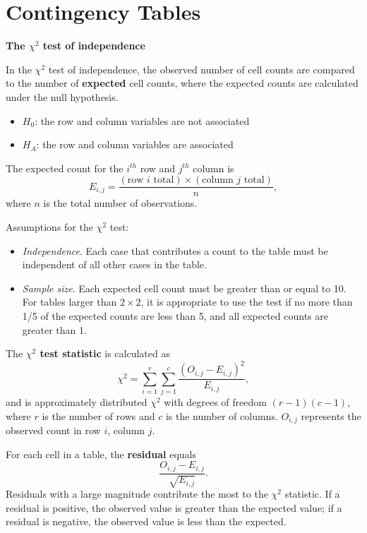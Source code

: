 \documentclass[letterpaper,12pt,twoside,]{pinp}
\begin{document}
\newpage

\hypertarget{contingency-tables}{%
\section{Contingency Tables}\label{contingency-tables}}

\textbf{The \(\chi^2\) test of independence}

In the \(\chi^2\) test of independence, the observed number of cell
counts are compared to the number of \textbf{expected} cell counts,
where the expected counts are calculated under the null hypothesis.

\begin{itemize}
\item
  \(H_0\): the row and column variables are not associated
\item
  \(H_A\): the row and column variables are associated
\end{itemize}

The expected count for the \(i^{th}\) row and \(j^{th}\) column is
\[E_{i, j} = \dfrac{(\text{row $i$ total}) \times (\text{column $j$ total}) }{n}, \]
where \(n\) is the total number of observations.

Assumptions for the \(\chi^2\) test:

\begin{itemize}
\item
  \emph{Independence}. Each case that contributes a count to the table
  must be independent of all other cases in the table.
\item
  \emph{Sample size}. Each expected cell count must be greater than or
  equal to 10. For tables larger than \(2 \times 2\), it is appropriate
  to use the test if no more than 1/5 of the expected counts are less
  than 5, and all expected counts are greater than 1.
\end{itemize}

The \textbf{\(\chi^2\) test statistic} is calculated as
\[\chi^2 = \sum_{i = 1}^r \sum_{j = 1}^c \dfrac{(O_{i, j} - E_{i, j})^2}{E_{i, j}}, \]
and is approximately distributed \(\chi^2\) with degrees of freedom
\((r - 1)(c - 1)\), where \(r\) is the number of rows and \(c\) is the
number of columns. \(O_{i, j}\) represents the observed count in row
\(i\), column \(j\).

For each cell in a table, the \textbf{residual} equals
\[\dfrac{O_{i, j} - E_{i, j}}{\sqrt{E_{i,j}}}. \] Residuals with a large
magnitude contribute the most to the \(\chi^2\) statistic. If a residual
is positive, the observed value is greater than the expected value; if a
residual is negative, the observed value is less than the expected.
\end{document}
